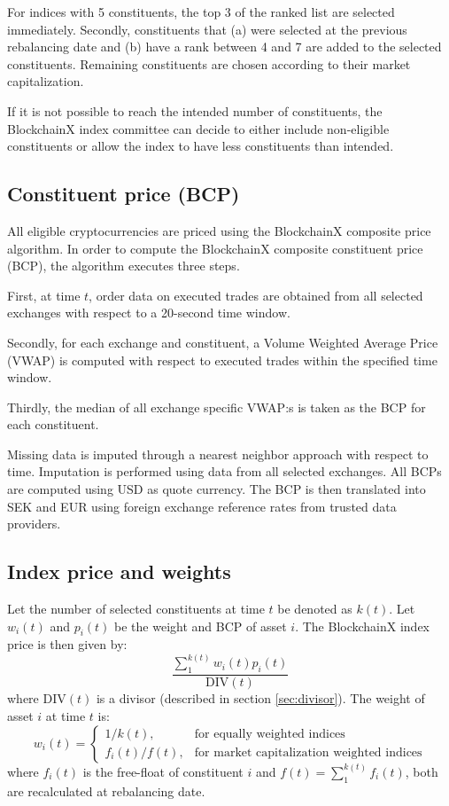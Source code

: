 \documentclass{article}
\begin{document}
For indices with 5 constituents, the top 3 of the ranked list are
selected immediately. Secondly, constituents that (a) were selected at
the previous rebalancing date and (b) have a rank between 4 and 7 are
added to the selected constituents. Remaining constituents are chosen
according to their market capitalization.

If it is not possible to reach the intended number of constituents, the
BlockchainX index committee can decide to either include non-eligible
constituents or allow the index to have less constituents than intended.

\subsection{Constituent price (BCP)}\label{sec:BCP}

All eligible cryptocurrencies are priced using the BlockchainX composite
price algorithm. In order to compute the BlockchainX composite
constituent price (BCP), the algorithm executes three steps.

First, at time \(t\), order data on executed trades are obtained from
all selected exchanges with respect to a 20-second time window.

Secondly, for each exchange and constituent, a Volume Weighted Average
Price (VWAP) is computed with respect to executed trades within the
specified time window.

Thirdly, the median of all exchange specific VWAP:s is taken as the BCP
for each constituent.

Missing data is imputed through a nearest neighbor approach with respect
to time. Imputation is performed using data from all selected exchanges.
All BCPs are computed using USD as quote currency. The BCP is then
translated into SEK and EUR using foreign exchange reference rates from
trusted data providers.

\subsection{Index price and weights}\label{index-price-and-weights}

Let the number of selected constituents at time \(t\) be denoted as
\(k(t)\). Let \(w_i(t)\) and \(p_i(t)\) be the weight and BCP of asset
\(i\). The BlockchainX index price is then given by: \[%
  \frac{  \sum_{1}^{k(t)} w_i(t) p_{i}(t)  }{\text{DIV}(t)}
\label{eq:index}\] where \(\text{DIV}(t)\) is a divisor (described in
section \ref{sec:divisor}). The weight of asset \(i\) at time \(t\) is:
\[w_i(t)=
\begin{cases}
    1 / k(t), & \text{for equally weighted indices} \\
    f_{i}(t) /f(t),  & \text{for market capitalization weighted indices}
\end{cases}\] where \(f_{i}(t)\) is the free-float of constituent \(i\)
and \(f(t)=\sum_1^{k(t)}f_i(t)\), both are recalculated at rebalancing
date.
\end{document}
